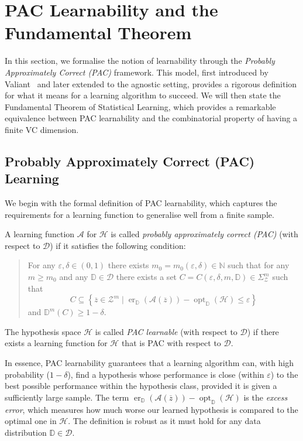\section{PAC Learnability and the Fundamental Theorem}

In this section, we formalise the notion of learnability through the \emph{Probably Approximately Correct (PAC)} framework. This model, first introduced by Valiant~\cite{Valiant1984} and later extended to the agnostic setting, provides a rigorous definition for what it means for a learning algorithm to succeed. We will then state the Fundamental Theorem of Statistical Learning, which provides a remarkable equivalence between PAC learnability and the combinatorial property of having a finite VC dimension.

\subsection{Probably Approximately Correct (PAC) Learning}

We begin with the formal definition of PAC learnability, which captures the requirements for a learning function to generalise well from a finite sample.

\begin{definition}
    \label{def:pac-learnability}
    A learning function $\mathcal{A}$ for $\mathcal{H}$ is called \emph{probably approximately correct (PAC)} (with respect to $\mathcal{D}$) if it satisfies the following condition:
    \begin{quote}
        For any $\varepsilon, \delta \in (0,1)$ there exists $m_0 = m_0(\varepsilon, \delta) \in \mathbb{N}$ such that for any $m \ge m_0$ and any $\mathbb{D} \in \mathcal{D}$ there exists a set $C = C(\varepsilon, \delta, m, \mathbb{D}) \in \Sigma_{\mathcal{Z}}^m$ such that
        \[
            C \subseteq \left\{ \overline{z} \in \mathcal{Z}^m \mid \operatorname{er}_{\mathbb{D}}(\mathcal{A}(\overline{z})) - \operatorname{opt}_{\mathbb{D}}(\mathcal{H}) \le \varepsilon \right\}
        \]
        and $\mathbb{D}^m(C) \ge 1 - \delta$.
    \end{quote}
    The hypothesis space $\mathcal{H}$ is called \emph{PAC learnable} (with respect to $\mathcal{D}$) if there exists a learning function for $\mathcal{H}$ that is PAC with respect to $\mathcal{D}$.
\end{definition}

In essence, PAC learnability guarantees that a learning algorithm can, with high probability ($1-\delta$), find a hypothesis whose performance is close (within $\varepsilon$) to the best possible performance within the hypothesis class, provided it is given a sufficiently large sample. The term $\operatorname{er}_{\mathbb{D}}(\mathcal{A}(\overline{z})) - \operatorname{opt}_{\mathbb{D}}(\mathcal{H})$ is the \emph{excess error}, which measures how much worse our learned hypothesis is compared to the optimal one in $\mathcal{H}$. The definition is robust as it must hold for any data distribution $\mathbb{D} \in \mathcal{D}$.

